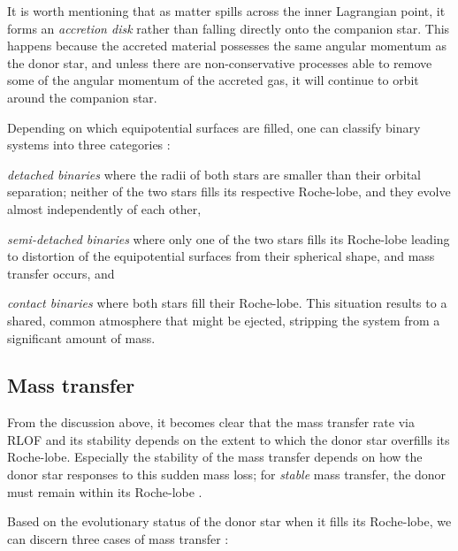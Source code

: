 \documentclass[../../main/thesis_msc.tex]{subfiles}
\begin{document}
				It is worth mentioning that as matter spills across the inner Lagrangian point, it forms an \emph{accretion disk} rather than falling directly onto the companion star. This happens because the accreted material possesses the same angular momentum as the donor star, and unless there are non-conservative processes able to remove some of the angular momentum of the accreted gas, it will continue to orbit around the companion star.
				
				Depending on which equipotential surfaces are filled, one can classify binary systems into three categories \citep[see also][]{Weigert1968}:
					\begin{enumerate*}[label=(\roman*)]
						\item \emph{detached binaries} where the radii of both stars are smaller than their orbital separation; neither of the two stars fills its respective Roche-lobe, and they evolve almost independently of each other,
						\item \emph{semi-detached binaries} where only one of the two stars fills its Roche-lobe leading to distortion of the equipotential surfaces from their spherical shape, and mass transfer occurs, and
						\item \emph{contact binaries} where both stars fill their Roche-lobe. This situation results to a shared, common atmosphere that might be ejected, stripping the system from a significant amount of mass.
					\end{enumerate*}									
				

					
			\subsection{Mass transfer}
			
				From the discussion above, it becomes clear that the mass transfer rate via RLOF and its stability depends on the extent to which the donor star overfills its Roche-lobe. Especially the stability of the mass transfer depends on how the donor star responses to this sudden mass loss; for \emph{stable} mass transfer, the donor must remain within its Roche-lobe \citep[see][for discussion]{Ivanova2015, Postnov2014, Soberman1997, Kalogera1996}.
				
				Based on the evolutionary status of the donor star when it fills its Roche-lobe, we can discern three cases of mass transfer \citep{Kipp1967, Lauterborn1970}:
				
\end{document}
